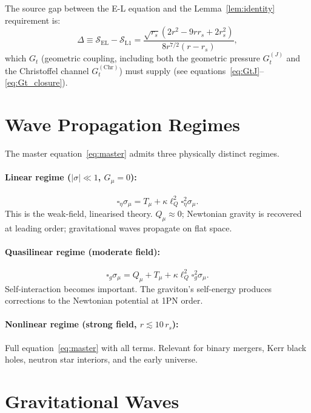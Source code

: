\documentclass[11pt,a4paper]{article}
\theoremstyle{plain}
\theoremstyle{definition}
\theoremstyle{remark}
\newcommand{\rs}{r_s}
\newcommand{\lQ}{\ell_Q}
\newcommand{\boxg}{\square_g}
\begin{document}
The source gap between the E-L equation and the Lemma~\ref{lem:identity} requirement is:
\begin{equation}
  \Delta \equiv \mathcal{S}_{\mathrm{EL}} - \mathcal{S}_{\mathrm{L1}}
  = \frac{\sqrt{\rs}(2r^2-9r\rs+2\rs^2)}{8r^{7/2}(r-\rs)},
  \label{eq:gap}
\end{equation}
which $G_t$ (geometric coupling, including both the geometric pressure $G_t^{(J)}$ and
the Christoffel channel $G_t^{(\mathrm{Chr})}$) must supply (see equations~\eqref{eq:GtJ}--\eqref{eq:Gt_closure}).

\section{Wave Propagation Regimes}
\label{sec:regimes}

The master equation~\eqref{eq:master} admits three physically distinct regimes.

\paragraph{Linear regime ($|\sigma|\ll 1$, $G_\mu = 0$):}
\[
  \square_\eta\sigma_\mu = T_\mu + \kappa\lQ^2\square_\eta^2\sigma_\mu.
\]
This is the weak-field, linearised theory.  $Q_\mu \approx 0$; Newtonian gravity is
recovered at leading order; gravitational waves propagate on flat space.

\paragraph{Quasilinear regime (moderate field):}
\[
  \boxg\sigma_\mu = Q_\mu + T_\mu + \kappa\lQ^2\boxg^2\sigma_\mu.
\]
Self-interaction becomes important.  The graviton's self-energy produces corrections
to the Newtonian potential at 1PN order.

\paragraph{Nonlinear regime (strong field, $r \lesssim 10\,\rs$):}
Full equation~\eqref{eq:master} with all terms.  Relevant for binary mergers,
Kerr black holes, neutron star interiors, and the early universe.

\section{Gravitational Waves}
\label{sec:gw}
\end{document}

